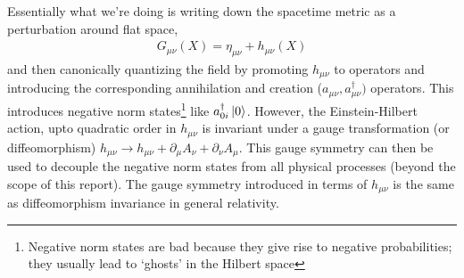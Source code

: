 \documentclass{article}
\begin{document}
Essentially what we're doing is writing down the spacetime metric as a perturbation around flat space,
\begin{align}
    G_{\mu\nu}(X)=\eta_{\mu\nu}+h_{\mu\nu}(X)
\end{align}
and then canonically quantizing the field by promoting $h_{\mu\nu}$ to operators and introducing the corresponding annihilation and creation ($a_{\mu\nu},a^\dagger_{\mu\nu})$ operators. This introduces negative norm states\footnote{Negative norm states are bad because they give rise to negative probabilities; they usually lead to `ghosts' in the Hilbert space} like $a^\dagger_{0i}\ket{0}$. However, the Einstein-Hilbert action, upto quadratic order in $h_{\mu\nu}$ is invariant under a gauge transformation (or diffeomorphism) $h_{\mu\nu}\rightarrow h_{\mu\nu}+\partial_\mu A_\nu+\partial_\nu A_\mu$. This gauge symmetry can then be used to decouple the negative norm states from all physical processes (beyond the scope of this report). The gauge symmetry introduced in terms of $h_{\mu\nu}$ is the same as diffeomorphism invariance in general relativity.
\end{document}
